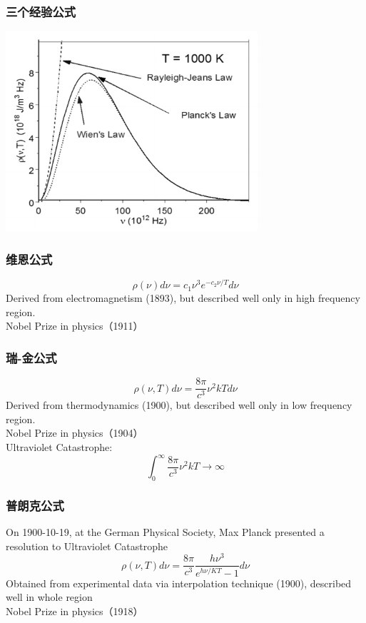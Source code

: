 \begin{frame}
    \frametitle{三个经验公式}
    \begin{center}
        \includegraphics[width=0.7\textwidth]{figs/threelaws.png}
    \end{center}
\end{frame}

\begin{frame}
    \frametitle{维恩公式}
    \begin{equation*}
        \rho(\nu) d \nu=c_{1} \nu^{3} e^{-c_{2} \nu / T} d \nu 
    \end{equation*}
    Derived from electromagnetism (1893), but described well only in high frequency region.\\ 
    {\color{deepred} Nobel Prize in physics（1911）}\\
\end{frame}

\begin{frame}
    \frametitle{瑞-金公式}
    \begin{equation*}
        \rho(\nu, T) d \nu=\frac{8 \pi}{c^{3}} \nu^{2} k T d \nu 
    \end{equation*}
    Derived from thermodynamics (1900), but described well only in low frequency region.\\ 
   {\color{deepred} Nobel Prize in physics（1904）}\\
   {\color{deepblue} Ultraviolet Catastrophe:} 
    \begin{equation*}
         \int_0 ^\infty \frac{8 \pi}{c^{3}} \nu^{2} k T \to \infty 
    \end{equation*}
\end{frame}

\begin{frame}
    \frametitle{普朗克公式}
    On 1900-10-19, at the German Physical Society, 
    Max Planck presented a resolution to {\color{deepblue} Ultraviolet Catastrophe} 
    \begin{equation}
        \rho(\nu, T) d \nu=\frac{8 \pi}{c^{3}} \frac{h \nu^{3}}{e^{h \nu / K T}-1} d \nu
    \end{equation}
    Obtained from experimental data via interpolation technique (1900), described well in whole region \\
    {\color{deepred} Nobel Prize in physics（1918）}\\
\end{frame}

